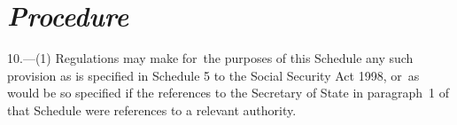 \documentclass[12pt,a4paper]{article}
\begin{document}
%
%
%


\section*{\itshape Procedure}

10.---(1) Regulations may make for~the purposes of this Schedule any such provision as is specified in Schedule 5 to the Social Security Act 1998, or~as would be so specified if the references to the Secretary of State in paragraph~1 of that Schedule were references to a relevant authority.
\end{document}
